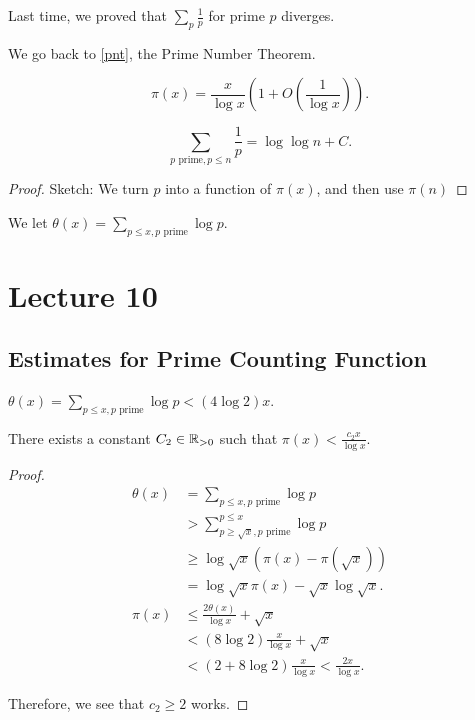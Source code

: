 \documentclass{article}
\begin{document}
Last time, we proved that $\sum_{p} \frac{1}{p}$ for prime $p$ diverges. 

We go back to \ref{pnt}, the Prime Number Theorem.

\begin{theorem*}
    \[\pi(x) = \frac{x}{\log x} \left(1 + O\left(\frac{1}{\log x}\right)\right).\]
\end{theorem*}

\begin{theorem}
    \[\sum_{p \text{ prime}, p \leq n} \frac{1}{p} = \log \log n + C.\]
\end{theorem}

\begin{proof}
    Sketch: We turn $p$ into a function of $\pi(x)$, and then use $\pi(n)$
\end{proof}
We let $\theta(x) = \sum_{p \leq x, p \text{ prime}} \log p$. 

\section{Lecture 10}
\subsection{Estimates for Prime Counting Function}
\begin{lemma}
    $\theta(x) = \sum_{p \leq x, p \text{ prime}} \log p < (4 \log 2) x$. 
\end{lemma}

\begin{proposition}
    There exists a constant $C_2 \in \mathbb R_{> 0}$ such that $\pi(x) < \frac{c_2 x}{\log x}$.
\end{proposition}

\begin{proof}
    \begin{align*}
        \theta(x) &= \sum_{p \leq x, p \text{ prime}} \log p \\
        &> \sum_{p \geq \sqrt x, p \text{ prime}}^{p \leq x} \log p \\
        &\geq \log \sqrt x (\pi(x) - \pi(\sqrt x)) \\
        &= \log \sqrt x \pi(x) - \sqrt x \log \sqrt x.
        \\ 
        \pi(x) &\leq \frac{2\theta(x)}{\log x} + \sqrt x \\
        &< (8 \log 2) \frac{x}{\log x} + \sqrt x \\
        &< (2 + 8 \log 2) \frac{x}{\log x} < \frac{2x}{\log x}.
    \end{align*}

    Therefore, we see that $c_2 \geq 2$ works. 
\end{proof}
\end{document}

